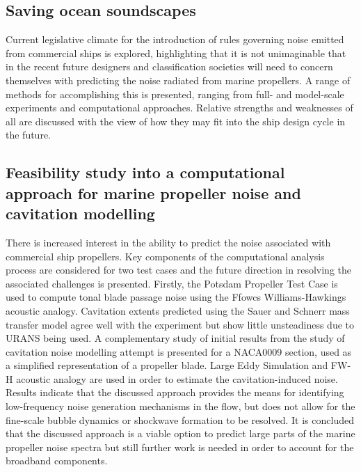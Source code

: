 \documentclass[a4paper,10pt]{article}
\begin{document}
\subsection{Saving ocean soundscapes \cite{Lidtke2016c}}

	Current legislative climate for the introduction of rules governing noise emitted from commercial ships is explored, highlighting that it is not unimaginable that in the recent future designers and classification societies will need to concern themselves with predicting the noise radiated from marine propellers. A range of methods for accomplishing this is presented, ranging from full- and model-scale experiments and computational approaches. Relative strengths and weaknesses of all are discussed with the view of how they may fit into the ship design cycle in the future.

\subsection{Feasibility study into a computational approach for marine propeller noise and cavitation modelling \cite{Lidtke2016a}}

	There is increased interest in the ability to predict the noise associated with commercial ship propellers. Key components of the computational analysis process are considered for two test cases and the future direction in resolving the associated challenges is presented. Firstly, the Potsdam Propeller Test Case is used to compute tonal blade passage noise using the Ffowcs Williams-Hawkings acoustic analogy. Cavitation extents predicted using the Sauer and Schnerr mass transfer model agree well with the experiment but show little unsteadiness due to URANS being used. A complementary study of initial results from the study of cavitation noise modelling attempt is presented for a NACA0009 section, used as a simplified representation of a propeller blade. Large Eddy Simulation and FW-H acoustic analogy are used in order to estimate the cavitation-induced noise. Results indicate that the discussed approach provides the means for identifying low-frequency noise generation mechanisms in the flow, but does not allow for the fine-scale bubble dynamics or shockwave formation to be resolved. It is concluded that the discussed approach is a viable option to predict large parts of the marine propeller noise spectra but still further work is needed in order to account for the broadband components.
\end{document}
